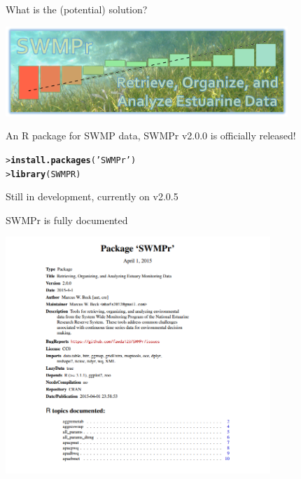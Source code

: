 \documentclass[serif]{beamer}\usepackage[]{graphicx}\usepackage[]{color}
\makeatletter
\newcommand{\hlstr}[1]{\textcolor[rgb]{0.192,0.494,0.8}{#1}}%
\newcommand{\hlstd}[1]{\textcolor[rgb]{0.345,0.345,0.345}{#1}}%
\newcommand{\hlkwd}[1]{\textcolor[rgb]{0.737,0.353,0.396}{\textbf{#1}}}%
\newenvironment{kframe}{%
 \def\at@end@of@kframe{}%
 \ifinner\ifhmode%
  \def\at@end@of@kframe{\end{minipage}}%
  \begin{minipage}{\columnwidth}%
 \fi\fi%
 \def\FrameCommand##1{\hskip\@totalleftmargin \hskip-\fboxsep
 \colorbox{shadecolor}{##1}\hskip-\fboxsep
     \hskip-\linewidth \hskip-\@totalleftmargin \hskip\columnwidth}%
 \MakeFramed {\advance\hsize-\width
   \@totalleftmargin\z@ \linewidth\hsize
   \@setminipage}}%
 {\par\unskip\endMakeFramed%
 \at@end@of@kframe}
\newenvironment{knitrout}{}{} %
\makeatother
\begin{document}
\begin{frame}[fragile]{What is the (potential) solution?}
\centerline{\includegraphics[width = 0.8\textwidth]{fig/swmpr_logo.png}}
\vspace{0.15in}
An R package for SWMP data, SWMPr v2.0.0 is officially released!
\begin{knitrout}
\color{fgcolor}\begin{kframe}
\begin{alltt}
\hlstd{> }\hlkwd{install.packages}\hlstd{(}\hlstr{'SWMPr'}\hlstd{)}
\hlstd{> }\hlkwd{library}\hlstd{(SWMPR)}
\end{alltt}
\end{kframe}
\end{knitrout}
Still in development, currently on v2.0.5
\end{frame}

\begin{frame}[fragile]{SWMPr is fully documented}
\centerline{\includegraphics[width = 0.75\textwidth]{fig/swmpr_manual.png}}
\end{frame}
\end{document}
